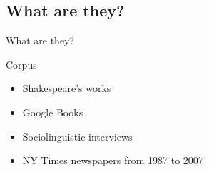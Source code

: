 \documentclass{beamer}
\newcommand{\subtwoone}{What are they?}
\begin{document}
    \subsection{\subtwoone}
      \begin{frame}{\subtwoone}
        \begin{alertblock}{Corpus}
          
        \end{alertblock}
        \begin{example}
          \begin{itemize}
            \item Shakespeare's works
            \item Google Books
            \item Sociolinguistic interviews
            \item NY Times newspapers from 1987 to 2007
          \end{itemize}
        \end{example}
      \end{frame}
\end{document}
